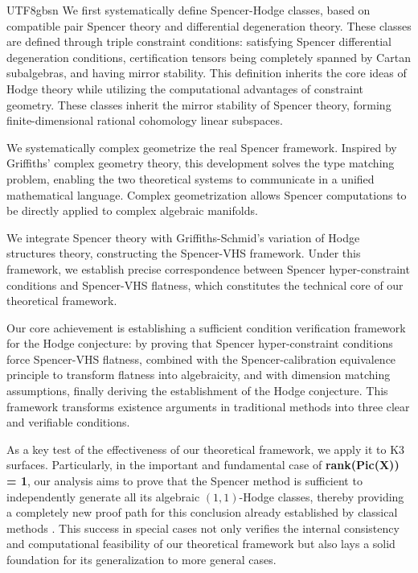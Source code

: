 \documentclass[a4paper,12pt]{extarticle}
\theoremstyle{definition}
\begin{document}
\begin{CJK}{UTF8}{gbsn}
We first systematically define Spencer-Hodge classes, based on compatible pair Spencer theory\cite{zheng2025dynamical} and differential degeneration theory\cite{zheng2025spencerdifferentialdegenerationtheory}. These classes are defined through triple constraint conditions: satisfying Spencer differential degeneration conditions, certification tensors being completely spanned by Cartan subalgebras, and having mirror stability. This definition inherits the core ideas of Hodge theory while utilizing the computational advantages of constraint geometry. These classes inherit the mirror stability of Spencer theory\cite{zheng2025mirror}, forming finite-dimensional rational cohomology linear subspaces.

We systematically complex geometrize the real Spencer framework. Inspired by Griffiths' complex geometry theory, this development solves the type matching problem, enabling the two theoretical systems to communicate in a unified mathematical language. Complex geometrization allows Spencer computations to be directly applied to complex algebraic manifolds.

We integrate Spencer theory with Griffiths-Schmid's variation of Hodge structures theory\cite{griffiths1968periods,schmid1973variation}, constructing the Spencer-VHS framework. Under this framework, we establish precise correspondence between Spencer hyper-constraint conditions and Spencer-VHS flatness, which constitutes the technical core of our theoretical framework.

Our core achievement is establishing a sufficient condition verification framework for the Hodge conjecture: by proving that Spencer hyper-constraint conditions force Spencer-VHS flatness, combined with the Spencer-calibration equivalence principle to transform flatness into algebraicity, and with dimension matching assumptions, finally deriving the establishment of the Hodge conjecture. This framework transforms existence arguments in traditional methods into three clear and verifiable conditions.

As a key test of the effectiveness of our theoretical framework, we apply it to K3 surfaces. Particularly, in the important and fundamental case of \textbf{rank(Pic(X)) = 1}, our analysis aims to prove that the Spencer method is sufficient to independently generate all its algebraic $(1,1)$-Hodge classes, thereby providing a completely new proof path for this conclusion already established by classical methods \cite{beauville1983varietes, huybrechts2016lectures}. This success in special cases not only verifies the internal consistency and computational feasibility of our theoretical framework but also lays a solid foundation for its generalization to more general cases.


\end{CJK}
\end{document}
